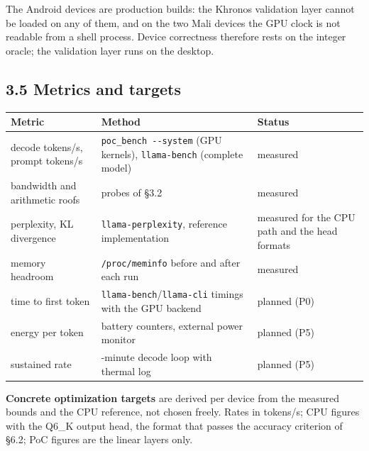 \documentclass[
  10pt,
]{article}
\newcounter{none} %
\begin{document}
The Android devices are production builds: the Khronos validation layer
cannot be loaded on any of them, and on the two Mali devices the GPU
clock is not readable from a shell process. Device correctness therefore
rests on the integer oracle; the validation layer runs on the desktop.

\subsection{3.5 Metrics and targets}\label{metrics-and-targets}

{\def\LTcaptype{none} %
\begin{longtable}[]{@{}
  >{\raggedright\arraybackslash}p{}
  >{\raggedright\arraybackslash}p{}
  >{\raggedright\arraybackslash}p{}@{}}
\toprule\noalign{}
\begin{minipage}[b]{\linewidth}\raggedright%
Metric
\end{minipage} & \begin{minipage}[b]{\linewidth}\raggedright%
Method
\end{minipage} & \begin{minipage}[b]{\linewidth}\raggedright%
Status
\end{minipage} \\
\midrule\noalign{}
\endhead%
\bottomrule\noalign{}
\endlastfoot%
decode tokens/s, prompt tokens/s & \texttt{poc\_bench\ -{}-system} (GPU
kernels), \texttt{llama-bench} (complete model) & measured \\
bandwidth and arithmetic roofs & probes of \S{}3.2 & measured \\
perplexity, KL divergence & \texttt{llama-perplexity}, reference
implementation & measured for the CPU path and the head formats \\
memory headroom & \texttt{/proc/meminfo} before and after each run &
measured \\
time to first token & \texttt{llama-bench}/\texttt{llama-cli} timings
with the GPU backend & planned (P0) \\
energy per token & battery counters, external power monitor & planned
(P5) \\
sustained rate & 30-minute decode loop with thermal log & planned
(P5) \\
\end{longtable}
}

\textbf{Concrete optimization targets} are derived per device from the
measured bounds and the CPU reference, not chosen freely. Rates in
tokens/s; CPU figures with the Q6\_K output head, the format that passes
the accuracy criterion of \S{}6.2; PoC figures are the linear layers only.
\end{document}
